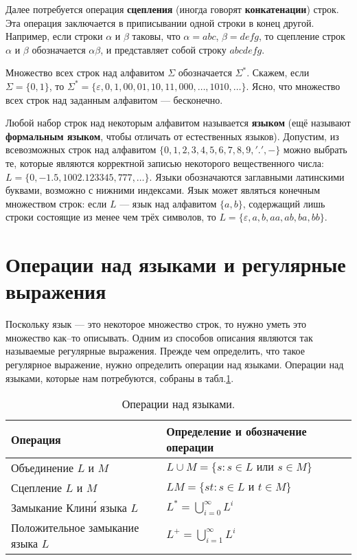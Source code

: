\documentclass[10pt]{report}
\begin{document}
Далее потребуется операция \textbf{сцепления} (иногда говорят \textbf{конкатенации}) строк. Эта операция заключается в приписывании одной строки в конец другой. Например,
если строки $\alpha$ и $\beta$ таковы, что $\alpha={abc}$, $\beta={defg}$, то сцепление строк $\alpha$ и $\beta$ обозначается $\alpha\beta$, и представляет собой строку ${abcdefg}$.

Множество всех строк над алфавитом $\Sigma$ обозначается $\Sigma^*$. Скажем, если $\Sigma=\{0,1\}$, то $\Sigma^*=\{\varepsilon,0,1,00,01,10,11,000,\dots,1010,\dots\}$. Ясно,
что множество всех строк над заданным алфавитом --- бесконечно.

Любой набор строк над некоторым алфавитом называется \textbf{языком} (ещё называют \textbf{формальным языком}, чтобы отличать от естественных языков). Допустим, из всевозможных строк над алфавитом $\{0,1,2, 3,4,5,6,7,8,9,'.',-\}$ можно выбрать те, которые являются корректной записью некоторого вещественного числа:
$L=\{0,-1.5,1002.123345,777,\dots\}$. Языки обозначаются заглавными латинскими буквами, возможно с нижними индексами. Язык может являться конечным множеством строк: если
$L$ --- язык над алфавитом $\{a,b\}$, содержащий лишь строки состоящие из менее чем трёх символов, то $L=\{\varepsilon,a,b,aa,ab,ba,bb\}$.

\section{Операции над языками и регулярные выражения}
Поскольку язык --- это некоторое множество строк, то нужно уметь это множество как--то описывать. Одним из способов описания являются так называемые регулярные выражения.
Прежде чем определить, что такое регулярное выражение, нужно определить операции над языками. Операции над языками, которые нам потребуются, собраны в табл.\ref{langops}.   %
\begin{table}[!h]
    \centering
    \caption{Операции над языками.}\label{langops}
    \vspace{1mm}
    \begin{tabular}{|l|p{70mm}|}\hline
        Операция                                                & Определение и обозначение операции            \\ \hline
        Объединение $L$ и $M$                                   & $L\cup M=\{s: s\in L\text{ или }s\in M\}$     \\ \hline
        Сцепление $L$ и $M$                                     & $LM=\{st: s\in L\text{ и }t\in M\}$           \\ \hline
        Замыкание Клин\'{и} языка $L$                           & $L^*=\bigcup\limits_{i=0}^\infty L^i$         \\ \hline
        Положительное замыкание языка $L$                       & $L^+=\bigcup\limits_{i=1}^\infty L^i$         \\ \hline
    \end{tabular}
\end{table}
\end{document}
